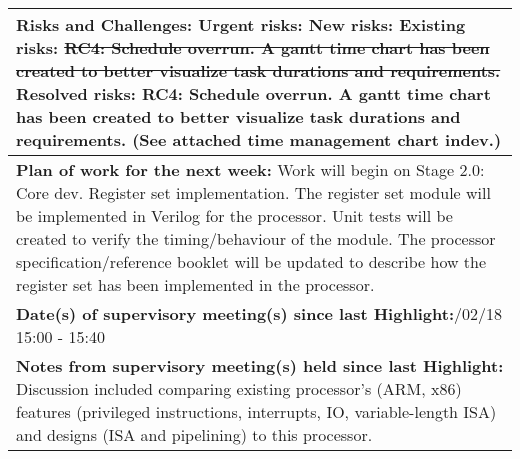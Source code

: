\begin{table}[H]
\begin{tabularx}{\textwidth}{|X|}
	\\ \hline
	\textbf{Risks and Challenges:}\newline
	{\color{red} Urgent risks:}\newline
	{\color{orange} New risks:}\newline
	{\color{purple} Existing risks:\newline
	\sout{RC4: Schedule overrun. A gantt time chart has been created to better visualize task durations and requirements.}}\newline
	{\color{gray} Resolved risks:\newline
	RC4: Schedule overrun. A gantt time chart has been created to better visualize task durations and requirements. (See attached time management chart indev.)}\newline
	\\ \hline
	\textbf{Plan of work for the next week:}\newline
	Work will begin on Stage 2.0: Core dev. Register set implementation.\newline\newline
	The register set module will be implemented in Verilog for the processor. Unit tests will be created to verify the timing/behaviour of the module.
	\newline
	The processor specification/reference booklet will be updated to describe how the register set has been implemented in the processor.
	
	\\ \hline
	\textbf{Date(s) of supervisory meeting(s) since last Highlight:}\newline
	08/02/18 15:00 - 15:40
	\\ \hline
	\textbf{Notes from supervisory meeting(s) held since last Highlight:}\newline
	Discussion included comparing existing processor's (ARM, x86) features (privileged instructions, interrupts, IO, variable-length ISA) and designs (ISA and pipelining) to this processor.
	\\ \hline
    \end{tabularx}
\end{table}

